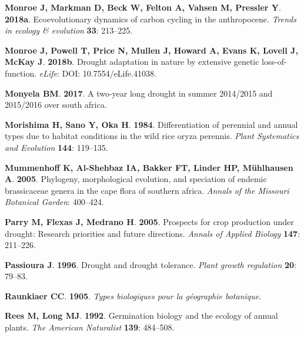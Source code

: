 \documentclass[man,floatsintext]{apa6}
\theoremstyle{definition}
\theoremstyle{definition}
\theoremstyle{definition}
\theoremstyle{remark}
\begin{document}
\leavevmode\hypertarget{ref-monroe2018ecoevolutionary}{}%
\textbf{\textnormal{Monroe J}, \textnormal{Markman D}, \textnormal{Beck
W}, \textnormal{Felton A}, \textnormal{Vahsen M}, \textnormal{Pressler
Y}}. \textbf{2018a}. Ecoevolutionary dynamics of carbon cycling in the
anthropocene. \emph{Trends in ecology \& evolution} \textbf{33}:
213--225.

\leavevmode\hypertarget{ref-monroe2018drought}{}%
\textbf{\textnormal{Monroe J}, \textnormal{Powell T}, \textnormal{Price
N}, \textnormal{Mullen J}, \textnormal{Howard A}, \textnormal{Evans K},
\textnormal{Lovell J}, \textnormal{McKay J}}. \textbf{2018b}. Drought
adaptation in nature by extensive genetic loss-of-function.
\emph{eLife}: DOI: 10.7554/eLife.41038.

\leavevmode\hypertarget{ref-monyela2017two}{}%
\textbf{\textnormal{Monyela BM}}. \textbf{2017}. A two-year long drought
in summer 2014/2015 and 2015/2016 over south africa.

\leavevmode\hypertarget{ref-morishima1984differentiation}{}%
\textbf{\textnormal{Morishima H}, \textnormal{Sano Y}, \textnormal{Oka
H}}. \textbf{1984}. Differentiation of perennial and annual types due to
habitat conditions in the wild rice oryza perennis. \emph{Plant
Systematics and Evolution} \textbf{144}: 119--135.

\leavevmode\hypertarget{ref-mummenhoff2005phylogeny}{}%
\textbf{\textnormal{Mummenhoff K}, \textnormal{Al-Shehbaz IA},
\textnormal{Bakker FT}, \textnormal{Linder HP}, \textnormal{Mühlhausen
A}}. \textbf{2005}. Phylogeny, morphological evolution, and speciation
of endemic brassicaceae genera in the cape flora of southern africa.
\emph{Annals of the Missouri Botanical Garden}: 400--424.

\leavevmode\hypertarget{ref-parry2005prospects}{}%
\textbf{\textnormal{Parry M}, \textnormal{Flexas J}, \textnormal{Medrano
H}}. \textbf{2005}. Prospects for crop production under drought:
Research priorities and future directions. \emph{Annals of Applied
Biology} \textbf{147}: 211--226.

\leavevmode\hypertarget{ref-passioura1996drought}{}%
\textbf{\textnormal{Passioura J}}. \textbf{1996}. Drought and drought
tolerance. \emph{Plant growth regulation} \textbf{20}: 79--83.

\leavevmode\hypertarget{ref-raunkiaer1905types}{}%
\textbf{\textnormal{Raunkiaer CC}}. \textbf{1905}. \emph{Types
biologiques pour la géographie botanique}.

\leavevmode\hypertarget{ref-rees1992germination}{}%
\textbf{\textnormal{Rees M}, \textnormal{Long MJ}}. \textbf{1992}.
Germination biology and the ecology of annual plants. \emph{The American
Naturalist} \textbf{139}: 484--508.
\end{document}
